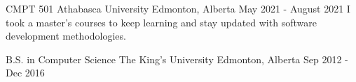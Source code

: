 
\begin{cventries}
  \cventry
    {CMPT 501} %
    {Athabasca University} %
    {Edmonton, Alberta} %
    {May 2021 - August 2021} %
    {I took a master's courses to keep learning and stay updated with software development methodologies.}

  \cventry
    {B.S. in Computer Science} %
    {The King's University} %
    {Edmonton, Alberta} %
    {Sep 2012 - Dec 2016} %
    {}
    
\end{cventries}